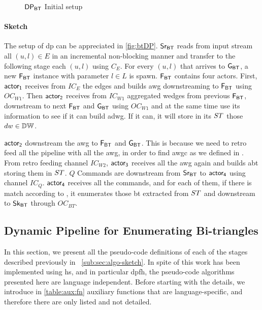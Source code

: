 \begin{figure}[h]
\centering  
{}
\caption{$\mathsf{DP_{BT}}$ Initial setup}
\label{fig:btDP}
\end{figure}

\paragraph{Sketch} The setup of \acrshort{dp} can be appreciated in \autoref{fig:btDP}. $\mathsf{Sr_{BT}}$ reads from input stream all $(u,l) \in E$ in an incremental non-blocking manner and transfer to the following stage each $(u,l)$ using $C_E$.
For every $(u,l)$ that arrives to $\mathsf{G_{BT}}$, a new $\mathsf{F_{BT}}$ instance with parameter $l \in L$ is spawn. $\mathsf{F_{BT}}$ contains four actors. 
First, $\mathsf{actor_1}$ receives from $IC_E$ the edges and builds \acrshort{awg} downstreaming to $\mathsf{F_{BT}}$ using $OC_{W1}$. 
Then $\mathsf{actor_2}$ receives from $IC_{W1}$ aggregated wedges from previous $\mathsf{F_{BT}}$, downstream to next $\mathsf{F_{BT}}$ and $\mathsf{G_{BT}}$ using $OC_{W1}$ and at the same time use its information to see 
if it can build \acrshort{adwg}. If it can, it will store in its $ST$ those $dw \in \mathbb{DW}$.

$\mathsf{actor_2}$ downstream the \acrshort{awg} to  $\mathsf{F_{BT}}$ and $\mathsf{G_{BT}}$. This is because we need to retro feed all the pipeline with all the \acrshort{awg}, in order to find \acrshort{awgc} as we defined in .
From retro feeding channel $IC_{W2}$, $\mathsf{actor_3}$ receives all the \acrshort{awg} again and builds \acrshort{abt} storing them in $ST$. 
$Q$ Commands are downstream from $\mathsf{Sr_{BT}}$ to $\mathsf{actor_4}$ using channel $IC_Q$. $\mathsf{actor_4}$ receives all the commands, and for each of them, if there is match according to , it enumerates those \acrshort{bt} extracted from $ST$ and downstream to $\mathsf{Sk_{BT}}$ through $OC_{BT}$.

\subsection{Dynamic Pipeline for Enumerating Bi-triangles}
In this section, we present all the pseudo-code definitions of each of the stages described previously in ~\autoref{sub:sec:algo-sketch}. 
In spite of this work has been implemented using \acrshort{hs}, and in particular \acrshort{dpfh}, the pseudo-code algorithms presented here are language independent.
Before starting with the details, we introduce in \autoref{table:aux:fn} auxiliary functions that are language-specific, and therefore there are only listed and not detailed.

